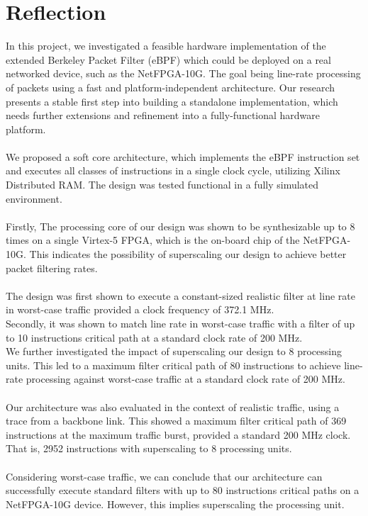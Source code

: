 \documentclass{l4proj}
\begin{document}
\section{Reflection}
In this project, we investigated a feasible hardware implementation of the extended Berkeley Packet Filter (eBPF) which could be deployed on a real networked device, such as the NetFPGA-10G. The goal being line-rate processing of packets using a fast and platform-independent architecture. Our research presents a stable first step into building a standalone implementation, which needs further extensions and refinement into a fully-functional hardware platform.\\\\
We proposed a soft core architecture, which implements the eBPF instruction set and executes all classes of instructions in a single clock cycle, utilizing Xilinx Distributed RAM. The design was tested functional in a fully simulated environment.\\\\
Firstly, The processing core of our design was shown to be synthesizable up to 8 times on a single Virtex-5 FPGA, which is the on-board chip of the NetFPGA-10G. This indicates the possibility of superscaling our design to achieve better packet filtering rates.\\\\
The design was first shown to execute a constant-sized realistic filter at line rate in worst-case traffic provided a clock frequency of 372.1 MHz.\\
Secondly, it was shown to match line rate in worst-case traffic with a filter of up to 10 instructions critical path at a standard clock rate of 200 MHz.\\
We further investigated the impact of superscaling our design to 8 processing units. This led to a maximum filter critical path of 80 instructions to achieve line-rate processing against worst-case traffic at a standard clock rate of 200 MHz.\\\\
Our architecture was also evaluated in the context of realistic traffic, using a trace from a backbone link. This showed a maximum filter critical path of 369 instructions at the maximum traffic burst, provided a standard 200 MHz clock. That is, 2952 instructions with superscaling to 8 processing units.\\\\
Considering worst-case traffic, we can conclude that our architecture can successfully execute standard filters with up to 80 instructions critical paths on a NetFPGA-10G device. However, this implies superscaling the processing unit.
\end{document}
